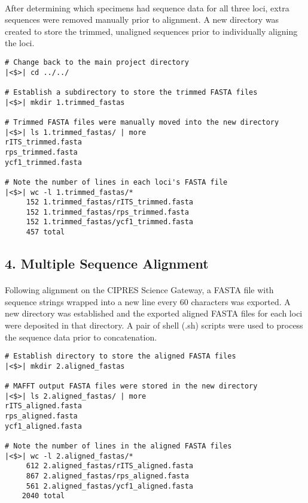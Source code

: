 \clearpage

\paragraph{} After determining which specimens had sequence data for all three loci, extra sequences were removed manually prior to alignment.  A new directory was created to store the trimmed, unaligned sequences prior to individually aligning the loci.  

\vspace*{30pt}

\begin{lstlisting}[caption=Create directory for trimmed FASTA files]
# Change back to the main project directory
|<$>| cd ../../

# Establish a subdirectory to store the trimmed FASTA files
|<$>| mkdir 1.trimmed_fastas

# Trimmed FASTA files were manually moved into the new directory
|<$>| ls 1.trimmed_fastas/ | more
rITS_trimmed.fasta
rps_trimmed.fasta
ycf1_trimmed.fasta

# Note the number of lines in each loci's FASTA file
|<$>| wc -l 1.trimmed_fastas/*
     152 1.trimmed_fastas/rITS_trimmed.fasta
     152 1.trimmed_fastas/rps_trimmed.fasta
     152 1.trimmed_fastas/ycf1_trimmed.fasta
     457 total
\end{lstlisting}

\clearpage

\subsection*{4. Multiple Sequence Alignment}

\paragraph{} Following alignment on the CIPRES Science Gateway, a FASTA file with sequence strings wrapped into a new line every 60 characters was exported.   A new directory was established and the exported aligned FASTA files for each loci were deposited in that directory.  A pair of shell (.sh) scripts were used to process the sequence data prior to concatenation.

\vspace*{30pt}

\begin{lstlisting}[caption=Save aligned sequences in \textit{2.aligned\_fastas/}]
# Establish directory to store the aligned FASTA files
|<$>| mkdir 2.aligned_fastas

# MAFFT output FASTA files were stored in the new directory
|<$>| ls 2.aligned_fastas/ | more
rITS_aligned.fasta
rps_aligned.fasta
ycf1_aligned.fasta

# Note the number of lines in the aligned FASTA files
|<$>| wc -l 2.aligned_fastas/*
     612 2.aligned_fastas/rITS_aligned.fasta
     867 2.aligned_fastas/rps_aligned.fasta
     561 2.aligned_fastas/ycf1_aligned.fasta
    2040 total

\end{lstlisting}

